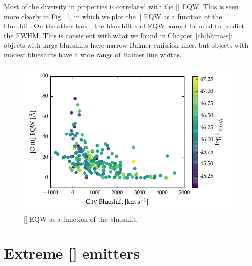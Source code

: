 Most of the diversity in  properties is correlated with the [] EQW. 
This is seen more clearly in Fig.~\ref{fig:civ_blueshift_oiii_eqw}, in which we plot the [] EQW as a function of the  blueshift. 
On the other hand, the  blueshift and EQW cannot be used to predict the \hb FWHM. 
This is consistent with what we found in Chapter~\ref{ch:bhmass}: objects with large  blueshifts have narrow Balmer emission-lines, but objects with modest  blueshifts have a wide range of Balmer line widths. 

\begin{figure}
    \centering
    \includegraphics[width=\columnwidth]{figures/chapter04/civ_blueshift_oiii_eqw.pdf} 
    \caption[{[] EQW as a function of the  blueshift.}]{[] EQW as a function of the  blueshift.}     
    \label{fig:civ_blueshift_oiii_eqw}
\end{figure}

\section{Extreme [] emitters}
\label{sec:extreme_oiii}

